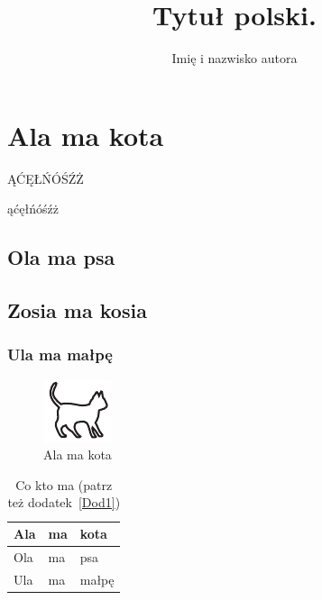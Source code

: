\documentclass[magister,archiwum,ramka,english]{dyplom}
\author{Imię i nazwisko autora}
\title{Tytuł polski.}
\begin{document}
\maketitle
\tableofcontents
\listoffigures
\listoftables





\chapter{Ala ma kota}

ĄĆĘŁŃÓŚŹŻ

ąćęłńóśźż

\lipsum[1]

\section{Ola ma psa}

\lipsum[2-3]

\section{Zosia ma kosia}

\lipsum[7]

\subsection{Ula ma małpę}

\lipsum[4-10]

\begin{figure}
\includegraphics[width=.4\textwidth]{kotek}
\caption{Ala ma kota}
\end{figure}

\lipsum[11-15]

\begin{table}
\caption{Co kto ma \cite{harel_rzecz_2008} (patrz też dodatek~\ref{Dod1})}
\begin{tabular}{|l|l|l|}
\hline
Ala & ma & kota \\
\hline
Ola & ma & psa \\
\hline
Ula & ma & małpę\\
\hline
\end{tabular}
\end{table}
\end{document}
